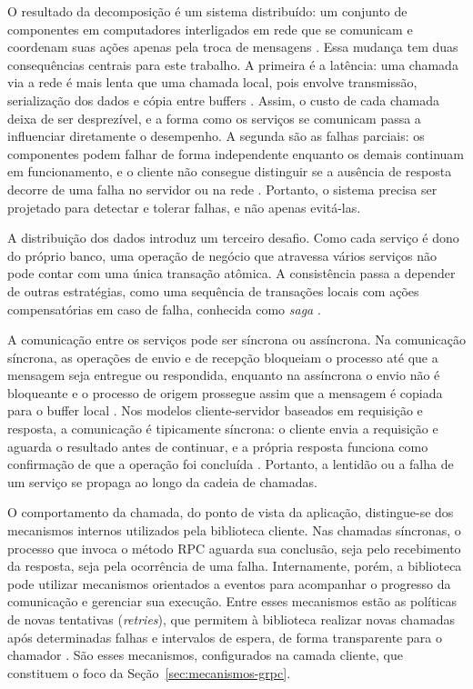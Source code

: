 O resultado da decomposição é um sistema distribuído: um conjunto de componentes em computadores
interligados em rede que se comunicam e coordenam suas ações apenas pela troca de mensagens
\cite{DistributedSystems:2013}. Essa mudança tem duas consequências centrais para este trabalho. A
primeira é a latência: uma chamada via a rede é mais lenta que uma chamada local, pois envolve
transmissão, serialização dos dados e cópia entre buffers \cite{DistributedSystems:2013}. Assim, o
custo de cada chamada deixa de ser desprezível, e a forma como os serviços se comunicam passa a
influenciar diretamente o desempenho. A segunda são as falhas parciais: os componentes podem falhar
de forma independente enquanto os demais continuam em funcionamento, e o cliente não consegue
distinguir se a ausência de resposta decorre de uma falha no servidor ou na rede
\cite{DistributedSystems:2013}. Portanto, o sistema precisa ser projetado para detectar e tolerar
falhas, e não apenas evitá-las.

A distribuição dos dados introduz um terceiro desafio. Como cada serviço é dono do próprio banco,
uma operação de negócio que atravessa vários serviços não pode contar com uma única transação
atômica. A consistência passa a depender de outras estratégias, como uma sequência de transações
locais com ações compensatórias em caso de falha, conhecida como \textit{saga}
\cite{BuildingMicroservices:2015}.

A comunicação entre os serviços pode ser síncrona ou assíncrona. Na comunicação síncrona, as
operações de envio e de recepção bloqueiam o processo até que a mensagem seja entregue ou
respondida, enquanto na assíncrona o envio não é bloqueante e o processo de origem prossegue assim
que a mensagem é copiada para o buffer local \cite{DistributedSystems:2013}. Nos modelos
cliente-servidor baseados em requisição e resposta, a comunicação é tipicamente síncrona: o cliente
envia a requisição e aguarda o resultado antes de continuar, e a própria resposta funciona como
confirmação de que a operação foi concluída \cite{DistributedSystems:2013}. Portanto, a lentidão ou
a falha de um serviço se propaga ao longo da cadeia de chamadas.

O comportamento da chamada, do ponto de vista da aplicação, distingue-se dos
mecanismos internos utilizados pela biblioteca cliente. Nas chamadas síncronas, o processo que
invoca o método RPC aguarda sua conclusão, seja pelo recebimento da resposta, seja pela ocorrência
de uma falha. Internamente, porém, a biblioteca pode utilizar mecanismos orientados a eventos para
acompanhar o progresso da comunicação e gerenciar sua execução. Entre esses mecanismos estão as
políticas de novas tentativas (\textit{retries}), que permitem à biblioteca realizar novas chamadas
após determinadas falhas e intervalos de espera, de forma transparente para o chamador
\cite{gRPC-Retry:2026}. São esses mecanismos, configurados na camada cliente, que constituem o foco
da Seção~\ref{sec:mecanismos-grpc}.

